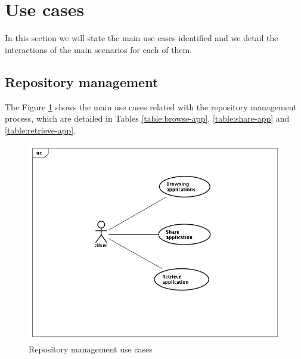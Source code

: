 
\section{Use cases}
\label{sec:use-cases}

In this section we will state the main use cases identified and we detail the
interactions of the main scenarios for each of them.


\subsection{Repository management}
\label{subsec:rm-use-cases}
The Figure \ref{img:uc-repository} shows the main use cases related with the
repository management process, which are detailed in Tables
\ref{table:browse-app}, \ref{table:share-app} and \ref{table:retrieve-app}.

\begin{figure}[h!]
 \begin{center}
 \includegraphics[scale=0.5]{diagrams/UseCasesDiagram-sharing.png}
  \caption{\label{img:uc-repository}Repository management use cases}
 \end{center}
\end{figure}


